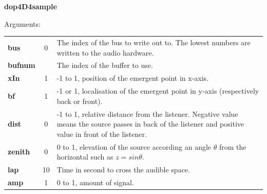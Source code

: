 \newpage

\begin{addmargin}[1em]{0em}%
\begin{mdframed}[style=mystyle]

\bigskip

{\large \textbf{dop4D4sample}}

\hrulefill

\color{gray!80}Arguments:\color{black} 

\bigskip

\begin{tabular}{l c p{7.5cm}}
\textbf{bus} & 0 & The index of the bus to write out to. The lowest numbers are written to the audio hardware.\\
\textbf{bufnum} &  & The index of the buffer to use.\\
\textbf{xIn} & 1 &  -1 to 1, position of the emergent point in x-axis.\\
\textbf{bf} & 1 &  -1 or 1, localisation of the emergent point in y-axis (respectively back or front).\\
\textbf{dist} & 0 & -1 to 1, relative distance from the listener. Negative value means the source passes in back of the listener and positive value in front of the listener. \\
\textbf{zenith} & 0 & 0 to 1, elevation of the source according an angle $\theta$ from the horizontal such as $z=sin \theta$. \\
\textbf{lap} & 10 &  Time in second to cross the audible space.\\
\textbf{amp} & 1 & 0 to 1, amount of signal.
\end{tabular}

\bigskip

\end{mdframed}
\end{addmargin}

